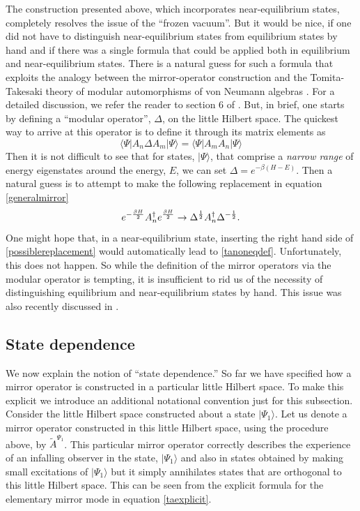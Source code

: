 \documentclass[12pt]{article}
\newcommand{\cop}[1]{#1}
\newcommand{\al}{\cop{A}} %
\def\tal{\widetilde{\al}} %
\newcommand{\be}{\begin{equation}}
\newcommand{\ee}{\end{equation}}
\begin{document}
The construction presented above, which incorporates near-equilibrium states,  completely resolves the issue of the ``frozen vacuum''. But it would be nice, if one did not have to 
 distinguish near-equilibrium states from equilibrium states by hand and if there was a single formula that could be applied both in equilibrium and near-equilibrium states. There is a natural guess for such a formula that exploits
the analogy between the mirror-operator construction and the Tomita-Takesaki theory of modular automorphisms of von Neumann algebras \cite{takesaki2006tomita}. For a detailed discussion, we refer the reader to section 6 of \cite{Papadodimas:2013jku}. But, in brief, one starts by defining a ``modular operator'', $\Delta$, on the little Hilbert space. The quickest way to arrive at this operator is to define it through its matrix elements as
\be
\label{deltadef}
\langle \Psi | A_n \Delta A_m |\Psi \rangle = \langle \Psi | A_m A_n |\Psi \rangle
\ee
Then it is not difficult to see that for states, $|\Psi \rangle$, that comprise a {\em narrow range} of energy eigenstates around the energy, $E$, we can set $\Delta = e^{-\beta (H - E)}$. Then a natural guess is to attempt to make the following replacement in equation \eqref{generalmirror} 
\be
\label{possiblereplacement}
 e^{-{\beta H \over 2}} \al_n^{\dagger} e^{\beta H \over 2} \rightarrow \Delta^{1 \over 2} \al_n^{\dagger} \Delta^{-{1 \over 2}}.
\ee
One might hope that, in a near-equilibrium state,  inserting the right hand side of \eqref{possiblereplacement} would automatically lead to  \eqref{tanoneqdef}. Unfortunately, this does not happen. So while the definition of the mirror operators via the modular operator is tempting, it is insufficient to rid us of the necessity of distinguishing equilibrium and near-equilibrium states by hand. This issue was also recently discussed in \cite{Jafferis:2020ora}.











\subsection{State dependence \label{secorigstate}}
We now explain the notion of ``state dependence.'' So far we have specified how a mirror operator is constructed in a particular little Hilbert space.  To make this explicit we introduce an additional notational convention just for this subsection. Consider the little Hilbert space constructed about a state $|\Psi_1 \rangle$. Let us denote a mirror operator constructed in this little Hilbert space, using the procedure above,  by  $\tal^{\Psi_1}$.   This particular mirror operator correctly describes the experience of an infalling observer in the state, $|\Psi_1 \rangle$ and also in states obtained by making small excitations of $|\Psi_1 \rangle$ but it  simply annihilates states that are orthogonal to this little Hilbert space. This can be seen from the explicit formula for the elementary mirror mode in equation \eqref{taexplicit}.
\end{document}
